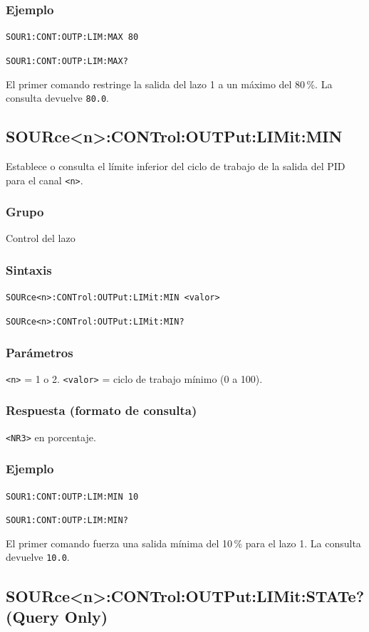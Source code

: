 \subsubsection*{Ejemplo}
\texttt{SOUR1:CONT:OUTP:LIM:MAX 80}\par
\texttt{SOUR1:CONT:OUTP:LIM:MAX?}

El primer comando restringe la salida del lazo 1 a un máximo del 80\,\%.
La consulta devuelve \texttt{80.0}.

\subsection*{SOURce<n>:CONTrol:OUTPut:LIMit:MIN}

Establece o consulta el límite inferior del ciclo de trabajo de la salida
del PID para el canal \texttt{<n>}.

\subsubsection*{Grupo}
Control del lazo

\subsubsection*{Sintaxis}
\texttt{SOURce<n>:CONTrol:OUTPut:LIMit:MIN <valor>}\par
\texttt{SOURce<n>:CONTrol:OUTPut:LIMit:MIN?}

\subsubsection*{Parámetros}
\texttt{<n>} = 1 o 2. \texttt{<valor>} = ciclo de trabajo mínimo (0 a 100).

\subsubsection*{Respuesta (formato de consulta)}
\texttt{<NR3>} en porcentaje.

\subsubsection*{Ejemplo}
\texttt{SOUR1:CONT:OUTP:LIM:MIN 10}\par
\texttt{SOUR1:CONT:OUTP:LIM:MIN?}

El primer comando fuerza una salida mínima del 10\,\% para el lazo 1. La
consulta devuelve \texttt{10.0}.

\subsection*{SOURce<n>:CONTrol:OUTPut:LIMit:STATe? (Query Only)}

